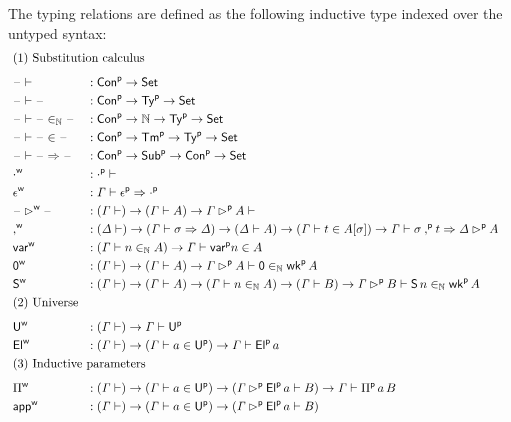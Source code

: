 \begin{definition}\label{def:typing_judgments}
  The typing relations are defined as the following inductive type indexed over the
  untyped syntax:
\begin{alignat*}{5}
  & \rlap{(1) Substitution calculus} \\[0.5em]
  & \blank \vdash && : \Conu\ra \Set \\
  & \blank \vdash \blank  && : \Conu\ra \Tyu\ra\Set \\
  & \blank \vdash \blank \invar \blank  && : \Conu\ra \N \ra \Tyu\ra \Set \\
  & \blank \vdash \blank \in \blank  && : \Conu\ra \Tmu\ra \Tyu\ra \Set \\
  & \blank \vdash \blank \Rightarrow \blank  && : \Conu\ra \Subu \ra \Conu\ra \Set \\
  & \emptyw && : \emptyu \vdash \\
  & \epsilonw && : \GG\vdash \epsilonu \Rightarrow \emptyu \\
  & \blank\extw\blank && : ( \GG\vdash )  \ra  (\GG\vdash A)  \ra
  \GG\extu A \vdash \\
  & \consw && :
    (\GD \vdash) \ra
    (\GG\vdash \sigma \Rightarrow\GD)\ra
    ( \GD \vdash A) \ra
    ( \GG \vdash t \in A[\sigma]) \ra
    \GG \vdash \sigma\consu t \Rightarrow \GD\extu A
   \\
  & \varw  && : (\GG \vdash n \invar A) \ra \GG \vdash \varu n \in A \\
  & \vzw  && : (\GG\vdash)\ra(\GG\vdash A)\ra\GG \extu  A \vdash \mathsf{0} \invar \wku \, A \\
  & \vsw  && : (\GG\vdash)\ra(\GG\vdash A)\ra(\GG \vdash n \invar A) \ra (\GG \vdash B) \ra \GG \extu  B
  \vdash \mathsf{S}\,n \invar \wku \, A \\
  & \rlap{(2) Universe} \\[0.5em]
  & \Uw && : (\GG \vdash)\ra \GG \vdash \Uu \\
  & \Elw && : (\GG \vdash)\ra (\GG \vdash a \in \Uu)\ra\GG \vdash \Elu\,a \\
  & \rlap{(3) Inductive parameters} \\[0.5em]
\  & \Piw && :
    (\GG \vdash)\ra (\GG \vdash a \in \Uu)\ra(\GG \extu
  \Elu\,a \vdash B)\ra\GG \vdash \Piu \, a \, B \\
  & \appw && :
    (\GG \vdash)\ra (\GG \vdash a \in \Uu)\ra(\GG \extu
    \Elu\,a \vdash B)
    \\

\end{alignat*}
\end{definition}
